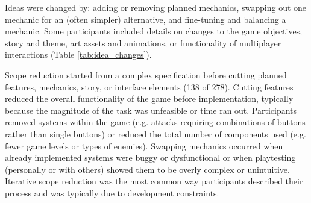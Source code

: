 \documentclass{sig-alternate}
\begin{document}



Ideas were changed by: adding or removing planned mechanics, swapping out one mechanic for an (often simpler) alternative, and fine-tuning and balancing a mechanic. Some participants included details on changes to the game objectives, story and theme, art assets and animations, or functionality of multiplayer interactions (Table \ref{tab:idea_changes}).

Scope reduction started from a complex specification before cutting planned features, mechanics, story, or interface elements (138 of 278).
Cutting features reduced the overall functionality of the game before implementation, typically because the magnitude of the task was unfeasible or time ran out. Participants removed systems within the game (e.g. attacks requiring combinations of buttons rather than single buttons) or reduced the total number of components used (e.g. fewer game levels or types of enemies).
Swapping mechanics occurred when already implemented systems were buggy or dysfunctional or when playtesting (personally or with others) showed them to be overly complex or unintuitive. 
Iterative scope reduction was the most common way participants described their process and was typically due to development constraints.
\end{document}
